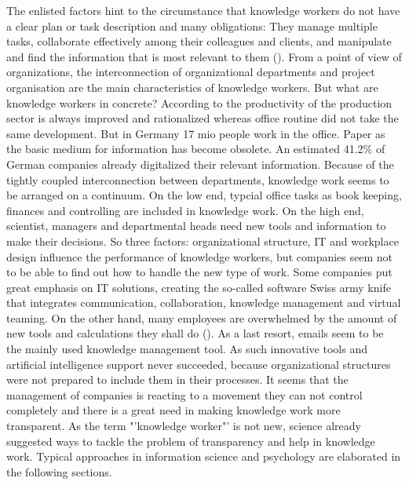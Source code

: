 The enlisted factors hint to the circumstance that knowledge workers do not have a clear plan or task description and many obligations: They manage multiple tasks, collaborate effectively among their colleagues and clients, and manipulate and find the information that is most relevant to them (\cite{voida2002integrating}). From a point of view of organizations, the interconnection of organizational departments and project organisation are the main characteristics of knowledge workers. But what are knowledge workers in concrete? According to \cite{spaeth2009info} the productivity of the production sector is always improved and rationalized whereas office routine did not take the same development. But in Germany 17 mio people work in the office. Paper as the basic medium for information has become obsolete. An estimated 41.2\% of German companies already digitalized their relevant information. Because of the tightly coupled interconnection between departments, knowledge work seems to be arranged on a continuum. On the low end, typcial office tasks as book keeping, finances and controlling are included in knowledge work. On the high end, scientist, managers and departmental heads need new tools and information to make their decisions. So three factors: organizational structure, IT and workplace design influence the performance of knowledge workers, but companies seem not to be able to find out how to handle the new type of work. Some companies put great emphasis on IT solutions, creating the so-called software Swiss army knife that integrates communication, collaboration, knowledge management and virtual teaming. On the other hand, many employees are overwhelmed by the amount of new tools and calculations they shall do (\cite{davenport2012mysterious}). As a last resort, emails seem to be the mainly used knowledge management tool. As such innovative tools and artificial intelligence support never succeeded, because organizational structures were not prepared to include them in their processes. It seems that the management of companies is reacting to a movement they can not control completely and there is a great need in making knowledge work more transparent. As the term "'knowledge worker"' is not new, science already suggested ways to tackle the problem of transparency and help in knowledge work. Typical approaches in information science and psychology are elaborated in the following sections.



